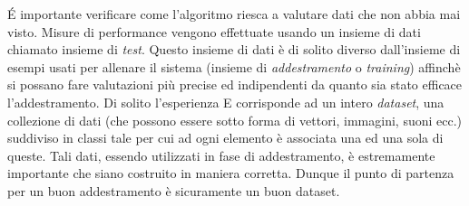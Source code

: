É importante verificare come l’algoritmo riesca a valutare dati che non abbia mai visto.
 Misure di performance vengono effettuate usando un insieme di dati chiamato insieme di \emph{test}.
  Questo insieme di dati è di solito diverso dall’insieme di esempi usati per allenare 
  il sistema (insieme di \emph{addestramento} o \emph{training}) affinchè si possano
   fare valutazioni
   più precise ed indipendenti da quanto sia stato efficace l’addestramento.
Di solito l’esperienza E corrisponde ad un intero \emph{dataset}, una collezione di dati
 (che possono essere sotto forma di vettori, immagini, suoni ecc.) 
 suddiviso in classi tale per cui ad ogni elemento è associata una ed una sola di queste. 
 Tali dati, essendo utilizzati
  in fase di addestramento, è estremamente importante che siano costruito in maniera corretta.
  Dunque il punto di partenza per un buon addestramento è sicuramente un buon dataset.
 \\
 
